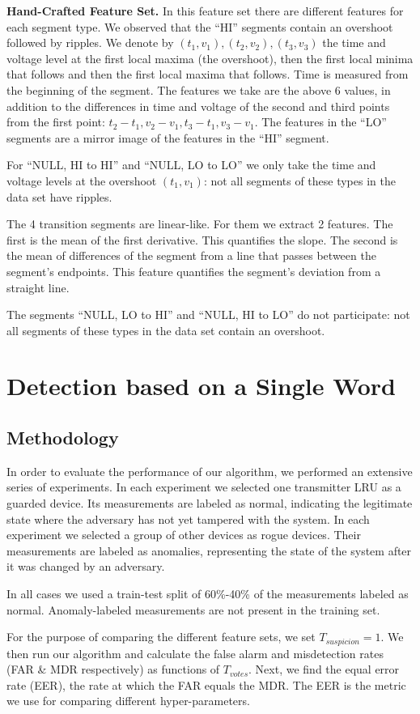 \documentclass[english]{llncs}
\newcommand{\level}[1]{\section{#1}}
\newcommand{\sublevel}[1]{\subsection{#1}}
\newcommand{\level}[1]{\chapter{#1}}
\newcommand{\sublevel}[1]{\section{#1}}
\begin{document}
{\bf Hand-Crafted Feature Set.}
  In this feature set there are different features for each segment type.
  We observed that the ``HI'' segments contain an overshoot followed by ripples. We denote by \((t_1, v_1), (t_2, v_2), (t_3, v_3)\) the time and voltage level at the first local maxima (the overshoot), then the first local minima that follows and then the first local maxima that follows. Time is measured from the beginning of the segment. The features we take are the above 6 values, in addition to the differences in time and voltage of the second and third points from the first point: \(t_2-t_1, v_2-v_1, t_3-t_1, v_3-v_1\). The features in the ``LO'' segments are a mirror image of the features in the ``HI'' segment.
  
  For ``NULL, HI to HI'' and ``NULL, LO to LO'' we only take the time and voltage levels at the overshoot \((t_1, v_1)\): not all segments of these types in the data set have ripples.
  
  The 4 transition segments are linear-like. For them we extract 2 features. The first is the mean of the first derivative. This quantifies the slope. The second
  is the mean of differences of the segment from a line that passes between the segment's endpoints. This feature quantifies the
  segment's deviation
  from a straight line.
  
  The segments ``NULL, LO to HI'' and ``NULL, HI to LO'' do not participate: not all segments of these types in the data set contain an overshoot.
  
\level{Detection based on a Single Word} \label{PerformanceEvaluationSingleWord}
\sublevel{Methodology} \label{Methodology}
  In order to evaluate the performance of our algorithm, we performed an extensive series of experiments. In each experiment we selected one transmitter LRU as a guarded device. Its measurements are labeled as normal, indicating the legitimate state where the adversary has not yet tampered with the system. In each experiment we selected a group of other devices as rogue devices. Their measurements are labeled as anomalies, representing the state of the system after it was changed by an adversary.
  
  In all cases we used a train-test split of 60\%-40\% of the measurements labeled as normal. Anomaly-labeled measurements are not present in the training set.
  
  For the purpose of comparing the different feature sets, we set $T_{suspicion} = 1$. We then run our algorithm and calculate the false alarm and misdetection rates (FAR \& MDR respectively) as functions of $T_{votes}$. Next, we find the equal error rate (EER), the rate at which the FAR equals the MDR. The EER is the metric we use for comparing different hyper-parameters.
  
\end{document}
